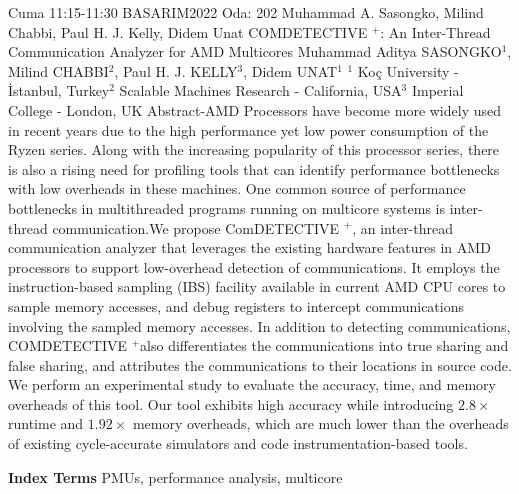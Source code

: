 
    \begin{abstract_basarim}
    {Cuma 11:15-11:30}
    {BASARIM2022}
    {Oda: 202}
    {Muhammad A. Sasongko, Milind Chabbi, Paul H. J. Kelly, Didem Unat}
    {COMDETECTIVE $^{+}$: An Inter-Thread Communication Analyzer for AMD Multicores}
    {%
    Muhammad Aditya SASONGKO$^{1}$, Milind CHABBI$^{2}$, Paul H. J. KELLY$^{3}$, Didem UNAT$^{1}$}
    {%
    }
    {%
    $^1$ Koç University - İstanbul, Turkey\newline{}$^2$ Scalable Machines Research - California, USA\newline{}$^3$ Imperial College - London, UK}
    Abstract-AMD Processors have become more widely used in recent years due to the high performance yet low power consumption of the Ryzen series. Along with the increasing popularity of this processor series, there is also a rising need for profiling tools that can identify performance bottlenecks with low overheads in these machines. One common source of performance bottlenecks in multithreaded programs running on multicore systems is inter-thread communication.\newline We propose ComDETECTIVE ${ }^{+}$, an inter-thread communication analyzer that leverages the existing hardware features in AMD processors to support low-overhead detection of communications. It employs the instruction-based sampling (IBS) facility available in current AMD CPU cores to sample memory accesses, and debug registers to intercept communications involving the sampled memory accesses. In addition to detecting communications, COMDETECTIVE ${ }^{+}$also differentiates the communications into true sharing and false sharing, and attributes the communications to their locations in source code. We perform an experimental study to evaluate the accuracy, time, and memory overheads of this tool. Our tool exhibits high accuracy while introducing $2.8 \times$ runtime and $1.92 \times$ memory overheads, which are much lower than the overheads of existing cycle-accurate simulators and code instrumentation-based tools. 
    
            \textbf{Index Terms} \newline{}PMUs, performance analysis, multicore
    \end{abstract_basarim}
    